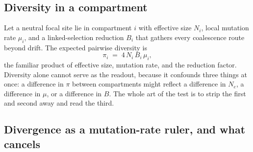 \documentclass[11pt,a4paper]{article}
\newcommand{\Ne}{N_{e}}
\begin{document}
\subsection{Diversity in a compartment}

Let a neutral focal site lie in compartment $i$ with effective size $N_i$, local mutation rate $\mu_i$, and a linked-selection reduction $B_i$ that gathers every coalescence route beyond drift. The expected pairwise diversity is
\begin{equation}
    \pi_i \;=\; 4\,N_i\,B_i\,\mu_i,
    \label{eq:pi}
\end{equation}
the familiar product of effective size, mutation rate, and the reduction factor. Diversity alone cannot serve as the readout, because it confounds three things at once: a difference in $\pi$ between compartments might reflect a difference in $\Ne$, a difference in $\mu$, or a difference in $B$. The whole art of the test is to strip the first and second away and read the third.

\subsection{Divergence as a mutation-rate ruler, and what cancels}
\end{document}
